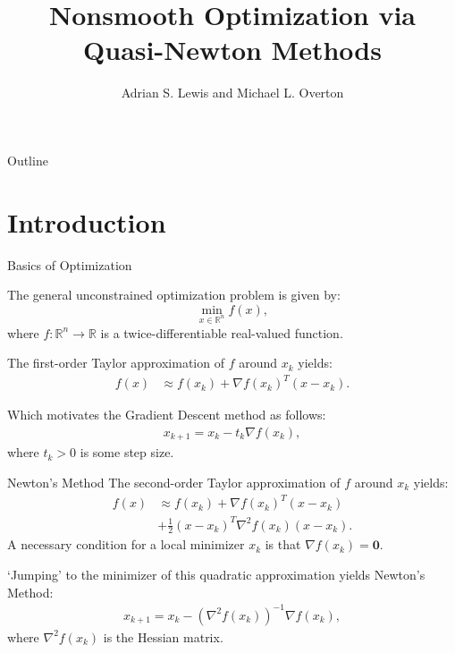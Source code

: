 \documentclass{beamer}
\title{Nonsmooth Optimization via Quasi-Newton Methods}
\author{Adrian S. Lewis and Michael L. Overton}
\date{}
\begin{document}
\begin{frame}
    \titlepage
\end{frame}

\begin{frame}{Outline}
    \tableofcontents
\end{frame}

\section{Introduction}
\begin{frame}{Basics of Optimization}

     {
        The general unconstrained optimization problem
        is given by:
        \begin{equation*}
            \min_{x \in \mathbb{R}^n} f(x),
        \end{equation*}
        where $f: \mathbb{R}^n \to \mathbb{R}$ is a
        twice-differentiable real-valued function.
    }

     {
        The first-order Taylor approximation
        of $f$ around $x_k$ yields:
        \begin{align*}
            f(x) & \approx f(x_k) + \nabla f(x_k)^T (x - x_k).
        \end{align*}
    }

     {
        Which motivates the Gradient Descent method as follows:
        \begin{align*}
            x_{k+ 1} = x_k - t_k \nabla f(x_k),
        \end{align*}
        where $t_k > 0$ is some step size.
    }
\end{frame}

\begin{frame}{Newton's Method}
     {
        The second-order Taylor approximation of $f$ around $x_k$ yields:
        \begin{align*}
            f(x) & \approx f(x_k) + \nabla f(x_k)^T (x - x_k)           \\
                 & + \frac{1}{2} (x - x_k)^T \nabla^2 f(x_k) (x - x_k).
        \end{align*}
        A necessary condition for a local minimizer $x_k$
        is that $\nabla f(x_k) = \mathbf{0}$.
    }

     {
        \vspace{0.5em}
        `Jumping' to the minimizer of this quadratic
        approximation yields Newton's Method:
        \begin{align*}
            x_{k+1} = x_k - (\nabla^2 f(x_k))^{-1} \nabla f(x_k),
        \end{align*}
        where $\nabla^2 f(x_k)$ is the Hessian matrix.
    }
\end{frame}
\end{document}
